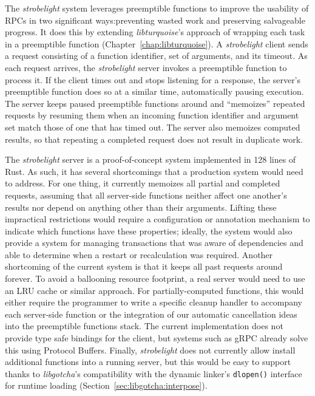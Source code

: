 The \textit{strobelight} system leverages preemptible functions to improve the
usability of RPCs in two significant ways:\@ preventing wasted work and preserving
salvageable progress.  It does this by extending \textit{libturquoise}'s approach of
wrapping each task in a preemptible function (Chapter~\ref{chap:libturquoise}).  A
\textit{strobelight} client sends a request consisting of a function identifier, set
of arguments, and its timeout.  As each request arrives, the \textit{strobelight}
server invokes a preemptible function to process it.  If the client times out and
stops listening for a response, the server's preemptible function does so at a
similar time, automatically pausing execution.  The server keeps paused preemptible
functions around and ``memoizes'' repeated requests by resuming them when an incoming
function identifier and argument set match those of one that has timed out.  The
server also memoizes computed results, so that repeating a completed request does not
result in duplicate work.

The \textit{strobelight} server is a proof-of-concept system implemented in 128 lines
of Rust.  As such, it has several shortcomings that a production system would need to
address.  For one thing, it currently memoizes all partial and completed requests,
assuming that all server-side functions neither affect one another's results nor
depend on anything other than their arguments.  Lifting these impractical
restrictions would require a configuration or annotation mechanism to indicate which
functions have these properties; ideally, the system would also provide a system for
managing transactions that was aware of dependencies and able to determine when a
restart or recalculation was required.  Another shortcoming of the current system is
that it keeps all past requests around forever.  To avoid a ballooning resource
footprint, a real server would need to use an LRU cache or similar approach.  For
partially-computed functions, this would either require the programmer to write a
specific cleanup handler to accompany each server-side function or the integration of
our automatic cancellation ideas into the preemptible functions stack.  The current
implementation does not provide type safe bindings for the client, but systems such
as gRPC already solve this using Protocol Buffers.  Finally, \textit{strobelight}
does not currently allow install additional functions into a running server, but this
would be easy to support thanks to \textit{libgotcha}'s compatibility with the
dynamic linker's \texttt{dlopen()} interface for runtime loading
(Section~\ref{sec:libgotcha:interpose}).
